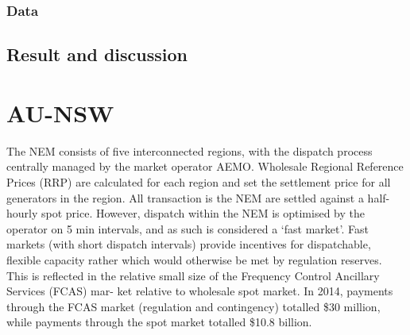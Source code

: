 \subsection{Data}

\section{Result and discussion}

\chapter{AU-NSW}

The NEM consists of five interconnected regions, with the dispatch process centrally managed by the market operator AEMO. Wholesale Regional Reference Prices (RRP) are calculated for each region and set the settlement price for all generators in the region. All transaction is the NEM are settled against a half-hourly spot price. However, dispatch within the NEM is optimised by the operator on 5 min intervals, and as such is considered a ‘fast market’. Fast markets (with short dispatch intervals) provide incentives for dispatchable, flexible capacity rather which would otherwise be met by regulation reserves.
This is reflected in the relative small size of the Frequency Control Ancillary Services (FCAS) mar- ket relative to wholesale spot market. In 2014, payments through the FCAS market (regulation and contingency) totalled \$30 million, while payments through the spot market totalled \$10.8 billion.
